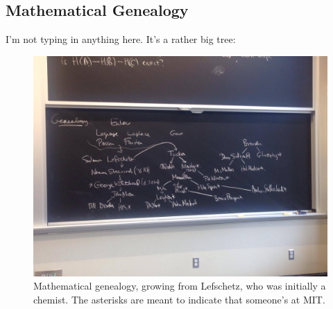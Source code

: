 \documentclass{amsart}
\theoremstyle{theorem}
\theoremstyle{definition}
\begin{document}
\subsection{Mathematical Genealogy}
I'm not typing in anything here. It's a rather big tree:
\begin{figure}[H]
\centering
\includegraphics[width=\textwidth]{math-family}
\caption{Mathematical genealogy, growing from Lefschetz, who was initially a chemist. The asterisks are meant to indicate that someone's at MIT.}
\end{figure}
\end{document}
